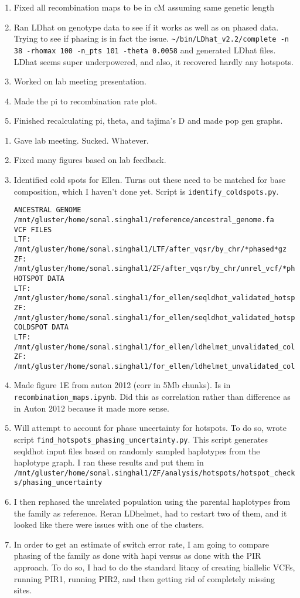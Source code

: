 \documentclass[idxtotoc,hyperref,openany,oneside]{labbook} %
\begin{document}
\begin{enumerate}
\item Fixed all recombination maps to be in cM assuming same genetic length
\item Ran LDhat on genotype data to see if it works as well as on phased data. Trying to see if phasing is in fact the issue. \verb+~/bin/LDhat_v2.2/complete -n 38 -rhomax 100 -n_pts 101 -theta 0.0058+ and generated LDhat files. LDhat seems super underpowered, and also, it recovered hardly any hotspots.
\item Worked on lab meeting presentation.
\item Made the pi to recombination rate plot.
\item Finished recalculating pi, theta, and tajima's D and made pop gen graphs.
\end{enumerate}

\begin{enumerate}
\item Gave lab meeting. Sucked. Whatever. 
\item Fixed many figures based on lab feedback.
\item Identified cold spots for Ellen. Turns out these need to be matched for base composition, which I haven't done yet. Script is \verb+identify_coldspots.py+.
\begin{verbatim}
ANCESTRAL GENOME
/mnt/gluster/home/sonal.singhal1/reference/ancestral_genome.fa
VCF FILES
LTF: /mnt/gluster/home/sonal.singhal1/LTF/after_vqsr/by_chr/*phased*gz
ZF: /mnt/gluster/home/sonal.singhal1/ZF/after_vqsr/by_chr/unrel_vcf/*phased*gz
HOTSPOT DATA
LTF: /mnt/gluster/home/sonal.singhal1/for_ellen/seqldhot_validated_hotspots.LTF.csv
ZF: /mnt/gluster/home/sonal.singhal1/for_ellen/seqldhot_validated_hotspots.ZF.csv
COLDSPOT DATA
LTF: /mnt/gluster/home/sonal.singhal1/for_ellen/ldhelmet_unvalidated_coldspots.LTF.csv
ZF: /mnt/gluster/home/sonal.singhal1/for_ellen/ldhelmet_unvalidated_coldspots.ZF.csv
\end{verbatim}
\item Made figure 1E from auton 2012 (corr in 5Mb chunks). Is in \verb+recombination_maps.ipynb+. Did this as correlation rather than difference as in Auton 2012 because it made more sense.
\item Will attempt to account for phase uncertainty for hotspots. To do so, wrote script \verb+find_hotspots_phasing_uncertainty.py+. This script generates seqldhot input files based on randomly sampled haplotypes from the haplotype graph. I ran these results and put them in \verb+/mnt/gluster/home/sonal.singhal1/ZF/analysis/hotspots/hotspot_checks/phasing_uncertainty+
\item I then rephased the unrelated population using the parental haplotypes from the family as reference. Reran LDhelmet, had to restart two of them, and it looked like there were issues with one of the clusters.
\item In order to get an estimate of switch error rate, I am going to compare phasing of the family as done with hapi versus as done with the PIR approach. To do so, I had to do the standard litany of creating biallelic VCFs, running PIR1, running PIR2, and then getting rid of completely missing sites.
\end{enumerate}
\end{document}
